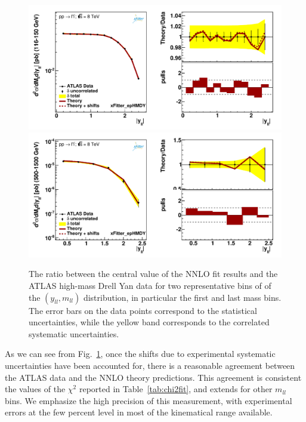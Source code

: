 \begin{figure}[t]
\centering
\includegraphics[width=16cm]{figs/data_401-1.pdf}\\
\includegraphics[width=16cm]{figs/data_405-1.pdf}\\
\caption{The ratio between the central value of the NNLO fit results
  and the ATLAS high-mass Drell Yan data
  for two representative bins of of the $(y_{ll},m_{ll})$ distribution,
  in particular the first and last mass bins.
  The error bars on the data points correspond to the statistical
  uncertainties, while the yellow band
  corresponds to the correlated systematic uncertainties.
}
\label{hmDY_2D}
\end{figure}

As we can see from Fig.~\ref{hmDY_2D}, once the shifts due to experimental systematic
uncertainties have been accounted for, there is a reasonable agreement
between the ATLAS data and the NNLO theory predictions.
%
This agreement is consistent the values of the $\chi^2$ reported in
Table~\ref{tab:chi2fit}, and extends for other $m_{ll}$ bins.
%
We emphasize the high precision of this measurement, with experimental
errors at the few percent level in most of the kinematical range available.

